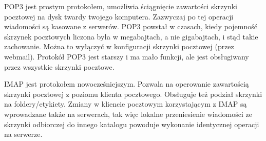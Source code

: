 POP3 jest prostym protokołem, umożliwia ściągnięcie zawartości skrzynki pocztowej na dysk twardy twojego komputera. Zazwyczaj po tej operacji wiadomości są kasowane z serwerów. POP3 powstał w czasach, kiedy pojemność skrzynek pocztowych liczona była w megabajtach, a nie gigabajtach, i stąd takie zachowanie. Można to wyłączyć w konfiguracji skrzynki pocztowej (przez webmail). Protokół POP3 jest starszy i ma mało funkcji, ale jest obsługiwany przez wszystkie skrzynki pocztowe.

IMAP jest protokołem nowocześniejszym. Pozwala na operowanie zawartością skrzynki pocztowej z poziomu klienta pocztowego. Obsługuje też podział skrzynki na foldery/etykiety. Zmiany w kliencie pocztowym korzystającym z IMAP są wprowadzane także na serwerach, tak więc lokalne przeniesienie wiadomości ze skrzynki odbiorczej do innego katalogu powoduje wykonanie identycznej operacji na serwerze. 
